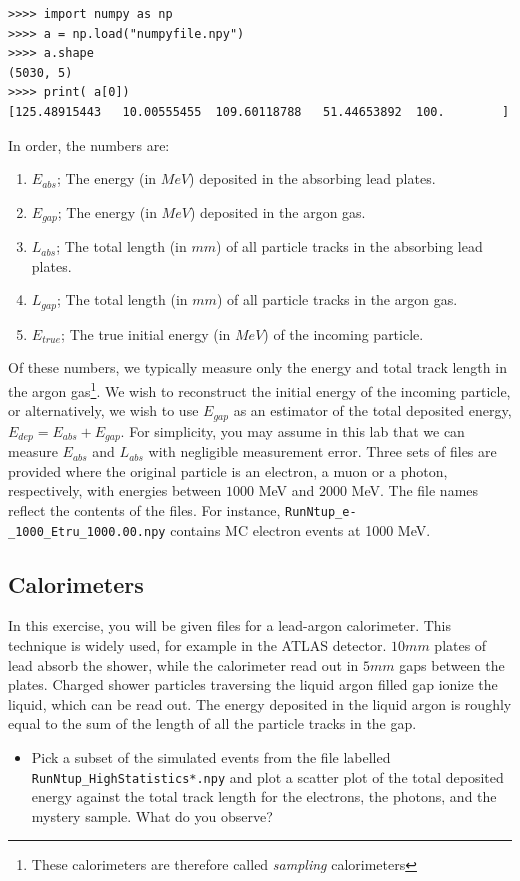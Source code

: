 \documentclass[11pt,a4paper]{exam}
\begin{document}
\begin{lstlisting}
>>>> import numpy as np
>>>> a = np.load("numpyfile.npy")
>>>> a.shape
(5030, 5)
>>>> print( a[0])
[125.48915443   10.00555455  109.60118788   51.44653892  100.        ]
\end{lstlisting}

In order, the numbers are: 
\begin{enumerate}[start=0]
    \item $E_{abs}$; The energy (in $MeV$) deposited in the absorbing lead plates.  
    \item $E_{gap}$; The energy (in $MeV$) deposited in the argon gas.
    \item $L_{abs}$; The total length (in $mm$) of all particle tracks in the absorbing lead plates. 
    \item $L_{gap}$; The total length (in $mm$) of all particle tracks in the argon gas. 
    \item $E_{true}$; The true initial energy (in $MeV$) of the incoming particle. 
\end{enumerate}
Of these numbers, we typically measure only the energy and total track length in the argon gas\footnote{These calorimeters are therefore called \emph{sampling} calorimeters}. We wish to reconstruct the initial energy of the incoming particle, or alternatively, we wish to use $E_{gap}$ as an estimator of the total deposited energy, $E_{dep}=E_{abs}+E_{gap}$. For simplicity, you may assume in this lab that we can measure $E_{abs}$ and $L_{abs}$ with negligible measurement error. Three sets of files are provided where the original particle is an electron, a muon or a photon, respectively, with energies between $1000$ MeV and $2000$ MeV. The file names reflect the contents of the files. For instance, \texttt{RunNtup\_e-\_1000\_Etru\_1000.00.npy} contains MC electron events at 1000 MeV.

\subsection{Calorimeters}
In this exercise, you will be given files for a lead-argon calorimeter. This technique is widely used, for example in the ATLAS detector. $10mm$ plates of lead absorb the shower, while the calorimeter read out in $5mm$ gaps between the plates. Charged shower particles traversing the liquid argon filled gap ionize the liquid, which can be read out. The energy deposited in the liquid argon is roughly equal to the sum of the length of all the particle tracks in the gap.
\begin{itemize}
    \item Pick a subset of the simulated events from the file labelled \texttt{RunNtup\_HighStatistics*.npy} and plot a scatter plot of the total deposited energy against the total track length for the electrons, the photons, and the mystery sample. What do you observe?
\end{itemize}
\end{document}
